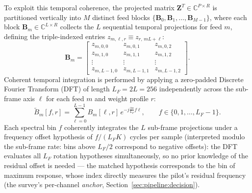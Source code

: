To exploit this temporal coherence, the projected matrix $\mathbf{Z}^T \in \mathbb{C}^{P \times R}$ is partitioned vertically into $M$ distinct feed blocks $\{\mathbf{B}_0, \mathbf{B}_1, \dots, \mathbf{B}_{M-1}\}$, where each block $\mathbf{B}_m \in \mathbb{C}^{L \times R}$ collects the $L$ sequential temporal projections for feed $m$, defining the triple-indexed entries $z_{m,\ell,r} \equiv z_{r, \, mL+\ell}$:
\begin{equation}
\mathbf{B}_m = \begin{bmatrix}
z_{m,0,0} & z_{m,0,1} & z_{m,0,2} \\
z_{m,1,0} & z_{m,1,1} & z_{m,1,2} \\
\vdots & \vdots & \vdots \\
z_{m,L-1,0} & z_{m,L-1,1} & z_{m,L-1,2}
\end{bmatrix}.
\end{equation}
Coherent temporal integration is performed by applying a zero-padded Discrete Fourier Transform (DFT) of length $L_F = 2L = 256$ independently across the sub-frame axis $\ell$ for each feed $m$ and weight profile $r$:
\begin{equation}
\widetilde{B}_m[f,r] = \sum_{\ell=0}^{L-1} B_m[\ell,r]\, e^{-j \frac{2\pi}{L_F} f \ell}, \qquad f \in \{0, 1, \dots, L_F-1\}.
\end{equation}
Each spectral bin $f$ coherently integrates the $L$ sub-frame projections under a frequency offset hypothesis of $f / (L_F K)$ cycles per sample (interpreted modulo the sub-frame rate: bins above $L_F/2$ correspond to negative offsets): the DFT evaluates all $L_F$ rotation hypotheses simultaneously, so no prior knowledge of the residual offset is needed --- the matched hypothesis corresponds to the bin of maximum response, whose index directly measures the pilot's residual frequency (the survey's per-channel \emph{anchor}, Section~\ref{sec:pipeline:decision}).

